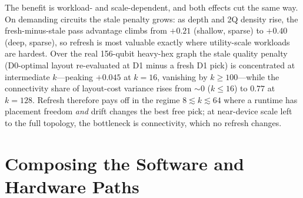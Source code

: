 \documentclass[journal,10pt,twocolumn]{IEEEtran}
\begin{document}
The benefit is workload- and scale-dependent, and both effects cut the same way. On demanding circuits the stale
penalty grows: as depth and 2Q density rise, the fresh-minus-stale pass advantage climbs from $+0.21$ (shallow,
sparse) to $+0.40$ (deep, sparse), so refresh is most valuable exactly where utility-scale workloads are hardest.
Over the real 156-qubit heavy-hex graph the stale quality penalty (D0-optimal layout re-evaluated at D1 minus a
fresh D1 pick) is concentrated at intermediate $k$---peaking $+0.045$ at $k{=}16$, vanishing by $k{\ge}100$---while
the connectivity share of layout-cost variance rises from $\sim0$ ($k{\le}16$) to $0.77$ at $k{=}128$. Refresh therefore
pays off in the regime $8\lesssim k\lesssim64$ where a runtime has placement freedom \emph{and} drift changes the
best free pick; at near-device scale left to the full topology, the bottleneck is connectivity, which no refresh
changes.

\section{Composing the Software and Hardware Paths}
\label{sec:e2e}
\end{document}
